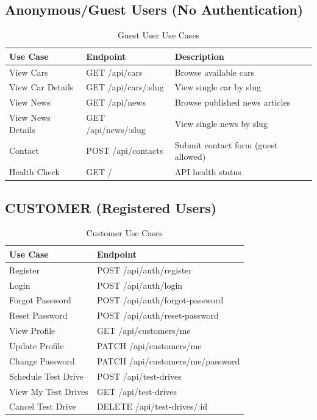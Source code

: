 \documentclass[12pt,a4paper]{article}
\begin{document}
\subsection{Anonymous/Guest Users (No Authentication)}

\begin{table}[h]
\centering
\caption{Guest User Use Cases}
\begin{tabular}{@{}lll@{}}
\toprule
Use Case & Endpoint & Description \\
\midrule
View Cars & GET /api/cars & Browse available cars \\
View Car Details & GET /api/cars/:slug & View single car by slug \\
View News & GET /api/news & Browse published news articles \\
View News Details & GET /api/news/:slug & View single news by slug \\
Contact & POST /api/contacts & Submit contact form (guest allowed) \\
Health Check & GET / & API health status \\
\bottomrule
\end{tabular}
\end{table}

\subsection{CUSTOMER (Registered Users)}

\begin{table}[h]
\centering
\caption{Customer Use Cases}
\begin{tabular}{@{}ll@{}}
\toprule
Use Case & Endpoint \\
\midrule
Register & POST /api/auth/register \\
Login & POST /api/auth/login \\
Forgot Password & POST /api/auth/forgot-password \\
Reset Password & POST /api/auth/reset-password \\
View Profile & GET /api/customers/me \\
Update Profile & PATCH /api/customers/me \\
Change Password & PATCH /api/customers/me/password \\
Schedule Test Drive & POST /api/test-drives \\
View My Test Drives & GET /api/test-drives \\
Cancel Test Drive & DELETE /api/test-drives/:id \\
\bottomrule
\end{tabular}
\end{table}
\end{document}

